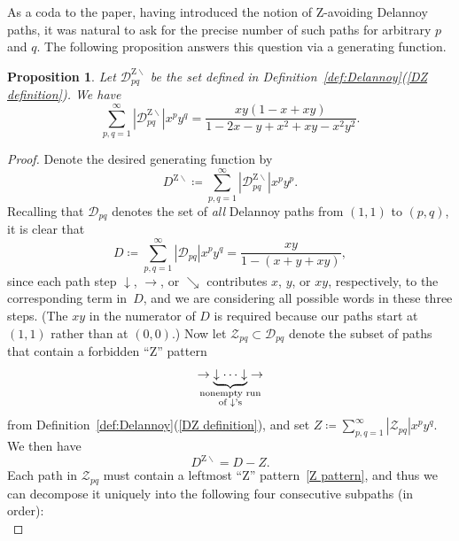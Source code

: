 \documentclass[noamsfonts,10pt]{amsart}
\newcommand{\D}{\mathcal{D}}
\newcommand{\DZ}{\mathcal{D}^{\mathrm{Z} \!\!\!\! \backslash}}
\newcommand{\1}{\mathbf{1}}
\theoremstyle{plain}
\newtheorem{proposition}[theorem]{Proposition}
\theoremstyle{definition}
\numberwithin{equation}{section}
\begin{document}
As a coda to the paper, having introduced the notion of Z-avoiding Delannoy paths, it was natural to ask for the precise number of such paths for arbitrary $p$ and $q$.
The following proposition answers this question via a generating function.

\begin{proposition}
    \label{prop:count Dpq}
    Let $\DZ_{pq}$ be the set defined in Definition~\ref{def:Delannoy}(\ref{DZ definition}).
    We have
    \[
        \sum_{p,q=1}^\infty \left| \DZ_{pq} \right| x^p y^q = \frac{xy(1 -x + xy)}{1- 2x - y + x^2 + xy -x^2y^2}.
    \]
\end{proposition}

\begin{proof}
    Denote the desired generating function by 
    \[
        D^{\mathrm{Z} \!\!\!\! \backslash} \coloneqq \sum_{p,q=1}^\infty \left| \DZ_{pq} \right| x^p y^p.
    \]
    Recalling that $\D_{pq}$ denotes the set of \emph{all} Delannoy paths from $(1,1)$ to $(p,q)$, it is clear that
    \begin{equation}
        \label{D equation}
        D \coloneqq \sum_{p,q=1}^\infty \left| \D_{pq} \right| x^p y^q = \frac{xy}{1-(x+y+xy)},
    \end{equation}
    since each path step $\downarrow$, $\rightarrow$, or $\searrow$ contributes $x$, $y$, or $xy$, respectively, to the corresponding term in~$D$, and we are considering all possible words in these three steps. 
    (The $xy$ in the numerator of $D$ is required because our paths start at $(1,1)$ rather than at $(0,0)$.)
    Now let $\mathcal{Z}_{pq} \subset \D_{pq}$ denote the subset of paths that contain a forbidden ``Z'' pattern
    \begin{equation}
        \label{Z pattern}
        \rightarrow \underbrace{\downarrow \cdots \downarrow}_{\mathclap{\substack{\text{nonempty run} \\ \text{of $\downarrow$'s}}}} \rightarrow
    \end{equation}
    from Definition~\ref{def:Delannoy}(\ref{DZ definition}), and set $Z \coloneqq \sum_{p,q=1}^\infty \left| \mathcal{Z}_{pq} \right| x^p y^q$.
    We then have
    \begin{equation}
        \label{DZ = D - Z}
        D^{\mathrm{Z} \!\!\!\! \backslash} = D - Z.
    \end{equation}
    Each path in $\mathcal{Z}_{pq}$ must contain a leftmost ``Z'' pattern~\eqref{Z pattern}, and thus we can decompose it uniquely into the following four consecutive subpaths (in order):
    \begin{equation}

\end{equation}
\end{proof}
\end{document}
